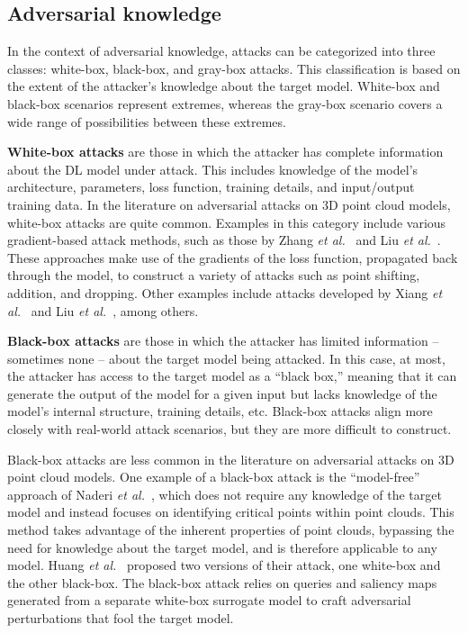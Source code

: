 \documentclass{ieeeaccess}
\def\etal{\textit{et al.}}
\begin{document}
\subsection{Adversarial knowledge}
\label{subsubsec:Adversarial Knowledge}

In the context of adversarial knowledge, attacks can be categorized into three classes: white-box, black-box, and gray-box attacks. This classification is based on the extent of the attacker's knowledge about the target model. White-box and black-box scenarios represent extremes, whereas the gray-box scenario covers a wide range of possibilities between these extremes.

\textbf{White-box attacks} are those in which the attacker has complete information about the DL model under attack. This includes knowledge of the model's architecture, parameters, loss function, training details, and input/output training data. In the literature on adversarial attacks on 3D point cloud models, white-box attacks are quite common. Examples in this category include various gradient-based attack methods, such as those by Zhang \etal~\cite{zheng2019pointcloud} and Liu \etal~\cite{liu2020adversarial}. These approaches make use of the gradients of the loss function, propagated back through the model, to construct a variety of attacks such as point shifting, addition, and dropping. Other examples include attacks developed by Xiang \etal~\cite{xiang2019generating} and Liu \etal~\cite{liu2019extending,liu2020adversarial}, among others.

\textbf{Black-box attacks} are those in which the attacker has limited information -- sometimes none -- about the target model being attacked. In this case, at most, the attacker has access to the target model as a ``black box,'' meaning that it can generate the output of the model for a given input but lacks knowledge of the model's internal structure, training details, etc. Black-box attacks align more closely with real-world attack scenarios, but they are more difficult to construct. 

Black-box attacks are less common in the literature on adversarial attacks on 3D point cloud models. One example of a black-box attack is the ``model-free'' approach of Naderi \etal~\cite{naderi2022model}, which does not require any knowledge of the target model and instead focuses on identifying critical points within point clouds. This method takes advantage of the inherent properties of point clouds, bypassing the need for knowledge about the target model, and is therefore applicable to any model. Huang \etal~\cite{huang2022shape} proposed two versions of their attack, one white-box and the other black-box. The black-box attack relies on queries and saliency maps generated from a separate white-box surrogate model to craft adversarial perturbations that fool the target model.
\end{document}

